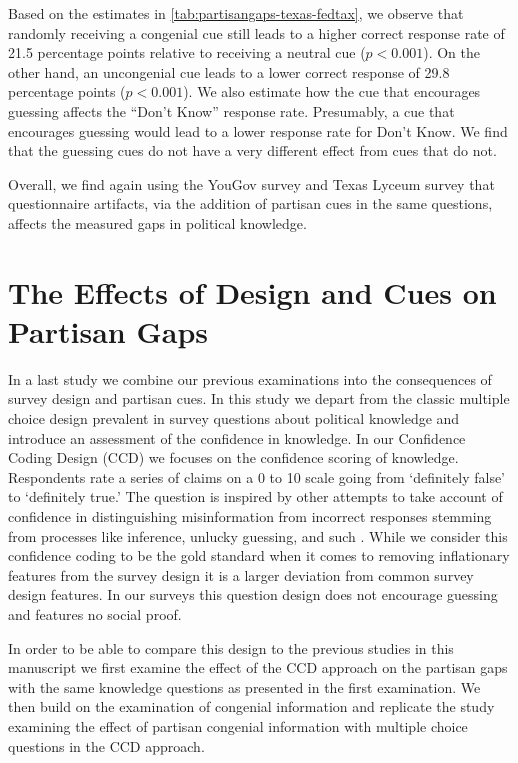 \documentclass[12pt, letterpaper]{article}
\begin{document}
Based on the estimates in \cref{tab:partisangaps-texas-fedtax}, we observe that randomly receiving a congenial cue still leads to a higher correct response rate of 21.5 percentage points relative to receiving a neutral cue ($p<0.001$). On the other hand, an uncongenial cue leads to a lower correct response of 29.8 percentage points ($p<0.001$).
We also estimate how the cue that encourages guessing affects the ``Don't Know'' response rate. Presumably, a cue that encourages guessing would lead to a lower response rate for Don't Know. We find that the guessing cues do not have a very different effect from cues that do not. 

Overall, we find again using the YouGov survey and Texas Lyceum survey that questionnaire artifacts, via the addition of partisan cues in the same questions, affects the measured gaps in political knowledge. 


\section*{The Effects of Design and Cues on Partisan Gaps}


In a last study we combine our previous examinations into the consequences of survey design and partisan cues. In this study we depart from the classic multiple choice design prevalent in survey questions about political knowledge and introduce an assessment of the confidence in knowledge. In our Confidence Coding Design (CCD) we focuses on the confidence scoring of knowledge. Respondents rate a series of claims on a 0 to 10 scale going from `definitely false' to `definitely true.' The question is inspired by other attempts to take account of confidence in distinguishing misinformation from incorrect responses stemming from processes like inference, unlucky guessing, and such  \citep[for instance,][]{pasek2015}. While we consider this confidence coding to be the gold standard when it comes to removing inflationary features from the survey design it is a larger deviation from common survey design features. In our surveys this question design does not encourage guessing and features no social proof.

In order to be able to compare this design to the previous studies in this manuscript we first examine the effect of the CCD approach on the partisan gaps with the same knowledge questions as presented in the first examination. We then build on the examination of congenial information and replicate the study examining the effect of partisan congenial information with multiple choice questions in the CCD approach.
\end{document}
